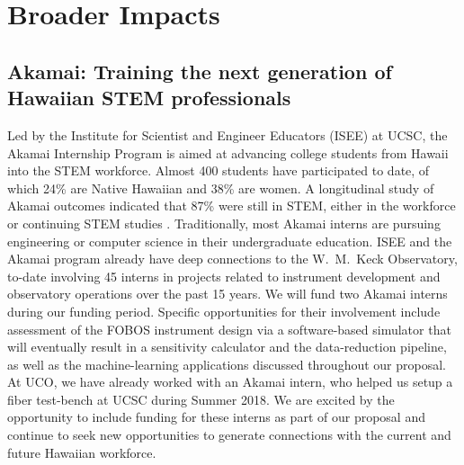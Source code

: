 \documentclass[oneside,11pt]{amsart}
\begin{document}
\section{Broader Impacts}
\label{sec:bi}


\subsection{Akamai: Training the next generation of Hawaiian STEM
professionals} Led by the Institute for Scientist and Engineer Educators
(ISEE) at UCSC, the Akamai Internship Program is aimed at advancing
college students from Hawaii into the STEM workforce.  Almost 400
students have participated to date, of which 24\% are Native Hawaiian
and 38\% are women. A longitudinal study of Akamai outcomes indicated
that 87\% were still in STEM, either in the workforce or continuing STEM
studies \citep{asee_peer_31030}.  Traditionally, most Akamai interns are
pursuing engineering or computer science in their undergraduate
education.  ISEE and the Akamai program already have deep connections to
the W.~M.~Keck Observatory, to-date involving 45 interns in projects
related to instrument development and observatory operations over the
past 15 years.  We will fund two Akamai interns during our funding
period.  Specific opportunities for their involvement include assessment
of the FOBOS instrument design via a software-based simulator that will
eventually result in a sensitivity calculator and the data-reduction
pipeline, as well as the machine-learning applications discussed
throughout our proposal.  At UCO, we have already worked with an Akamai
intern, who helped us setup a fiber test-bench at UCSC during Summer
2018. We are excited by the opportunity to include funding for these
interns as part of our proposal and continue to seek new opportunities
to generate connections with the current and future Hawaiian workforce.
\end{document}
